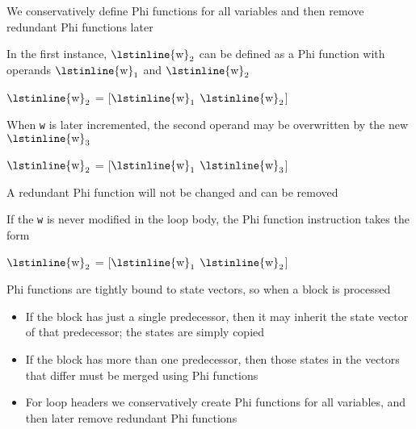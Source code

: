 \documentclass[8pt,a4paper,compress]{beamer}
\newcommand{\subs}[2]{${#1}_{#2}$}
\begin{document}
\begin{frame}[fragile]
\pause

We conservatively define Phi functions for all variables and then remove redundant Phi functions later

\pause
\bigskip

In the first instance, $\text{\lstinline{w}}_2$ can be defined as a Phi function with operands $\text{\lstinline{w}}_1$  and $\text{\lstinline{w}}_2$
\begin{production}
\subs{\text{\lstinline{w}}}{\text{2}}  = [\subs{\text{\lstinline{w}}}{\text{1}} \subs{\text{\lstinline{w}}}{\text{2}}]
\end{production}

\pause
\bigskip

When \lstinline{w} is later incremented, the second operand may be overwritten by the new $\text{\lstinline{w}}_3$
\begin{production}
\subs{\text{\lstinline{w}}}{\text{2}} = [\subs{\text{\lstinline{w}}}{\text{1}} \subs{\text{\lstinline{w}}}{\text{3}}]
\end{production}

\pause

A redundant Phi function will not be changed and can be removed

\pause
\bigskip

If the \lstinline{w} is never modified in the loop body, the Phi function instruction takes the form
\begin{production}
\subs{\text{\lstinline{w}}}{\text{2}} = [\subs{\text{\lstinline{w}}}{\text{1}} \subs{\text{\lstinline{w}}}{\text{2}}]
\end{production}

\pause
\bigskip

Phi functions are tightly bound to state vectors, so when a block is processed
\begin{itemize}
\item If the block has just a single predecessor, then it may inherit the state vector of that predecessor; the states are simply copied
\item If the block has more than one predecessor, then those states in the vectors that differ must be merged using Phi functions
\item For loop headers we conservatively create Phi functions for all variables, and then later remove redundant Phi functions
\end{itemize}
\end{frame}
\end{document}
